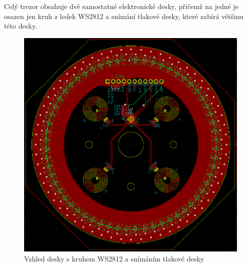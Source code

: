 \newpage

Celý trezor obsahuje dvě samostatné elektronické desky, přičemž na jedné je osazen jen kruh z ledek WS2812 a snímání tlakové desky, které zabírá 
většinu této desky.

\begin{figure}[htbp]
    \centering
    \includegraphics[width=\textwidth]{kapitoly/obrazky/E4/elektronika_tlakove_desky/leddeska-KiCad.png}
    \caption{Vzhled desky s kruhem WS2812 a snímáním tlakové desky}
    \label{fig:E4-LedDeska}
\end{figure}

\newpage